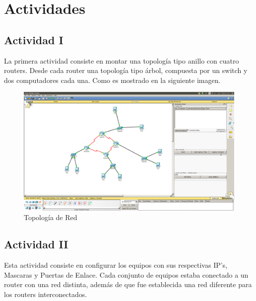 \documentclass[spanish]{udpreport}
\begin{document}
\chapter{Actividades}

\section{Actividad I}

La primera actividad consiste en montar una topología tipo anillo con cuatro routers. Desde cada router una topología tipo árbol, compuesta por un switch y dos computadores cada una. Como es mostrado en la siguiente imagen.

\begin{figure}[H]
	\centering
	\includegraphics[scale=.25]{imagenes/red.png}
	\caption{Topología de Red}
	\label{fig:Figura 2.1}
\end{figure}

\pagebreak

\section{Actividad II}

Esta actividad consiste en configurar los equipos con sus respectivas IP's, Mascaras y Puertas de Enlace. Cada conjunto de equipos estaba conectado a un router con una red distinta, además de que fue establecida una red diferente para los routers interconectados.
\end{document}
